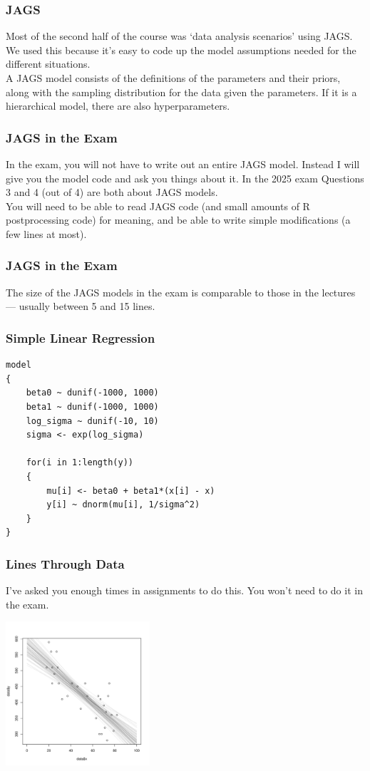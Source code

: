 \documentclass{beamer}
\begin{document}
\begin{frame}
\frametitle{JAGS}
Most of the second half of the course was `data analysis scenarios' using JAGS.
We used this because it's easy to code up the model assumptions needed for the
different situations.\pause\\[0.5em]

A JAGS model consists of the definitions of the parameters and their priors,
along with the sampling distribution for the data given the parameters. If it
is a hierarchical model, there are also hyperparameters.
\end{frame}


\begin{frame}
\frametitle{JAGS in the Exam}
In the exam, you will not have to write out an entire JAGS model. Instead I will
give you the model code and ask you things about it. In the 2025 exam Questions
3 and 4 (out of 4) are both about JAGS models.\pause\\[0.5em]

You will need to be able to read JAGS code (and small
amounts of R postprocessing code) for meaning, and be
able to write simple modifications (a few lines at most).
\end{frame}

\begin{frame}
\frametitle{JAGS in the Exam}
The size of the JAGS models in the exam is comparable to those in the lectures ---
usually between 5 and 15 lines.
\end{frame}


\begin{frame}[fragile]
\frametitle{Simple Linear Regression}

\footnotesize
\begin{verbatim}
model
{
    beta0 ~ dunif(-1000, 1000)
    beta1 ~ dunif(-1000, 1000)
    log_sigma ~ dunif(-10, 10)
    sigma <- exp(log_sigma)

    for(i in 1:length(y))
    {
        mu[i] <- beta0 + beta1*(x[i] - x)
        y[i] ~ dnorm(mu[i], 1/sigma^2)
    }
}
\end{verbatim}

\end{frame}


\begin{frame}[fragile]
\frametitle{Lines Through Data}
I've asked you enough times in assignments to do this. You won't need to do it
in the exam.

\centering
\includegraphics[width=0.4\textwidth]{images/road_lines.pdf}

\end{frame}
\end{document}
